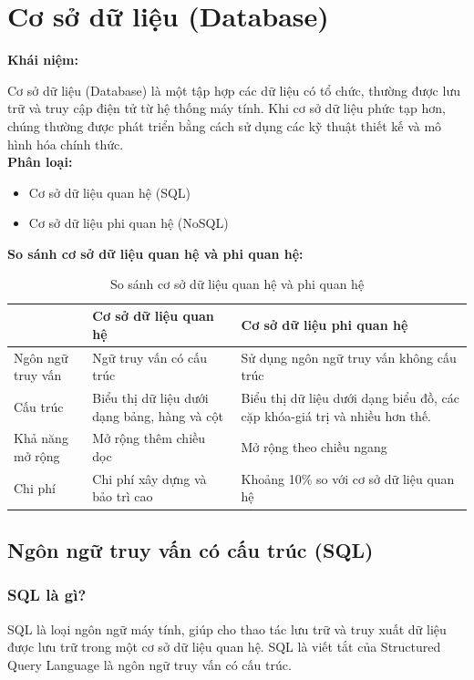 \section{Cơ sở dữ liệu (Database)}
\textbf{Khái niệm:}

Cơ sở dữ liệu (Database) là một tập hợp các dữ liệu có tổ chức, thường được lưu trữ và truy cập điện tử từ hệ thống máy tính. Khi cơ sở dữ liệu phức tạp hơn, chúng thường được phát triển bằng cách sử dụng các kỹ thuật thiết kế và mô hình hóa chính thức.\\

\textbf{Phân loại:}
\begin{itemize}
    \item Cơ sở dữ liệu quan hệ (SQL)
    \item Cơ sở dữ liệu phi quan hệ (NoSQL)
\end{itemize}

\textbf{So sánh cơ sở dữ liệu quan hệ và phi quan hệ:}
\begin{table}[H]
	    \centering
	    \begin{tabular}{|p{3cm}|p{6cm}|p{6cm}|}
	    \hline
	    &Cơ sở dữ liệu quan hệ&Cơ sở dữ liệu phi quan hệ\\
	    \hline
	    Ngôn ngữ truy vấn&Ngữ truy vấn có cấu trúc&Sử dụng ngôn ngữ truy vấn không cấu trúc\\
	    \hline
	    Cấu trúc&Biểu thị dữ liệu dưới dạng bảng, hàng và cột&Biểu thị dữ liệu dưới dạng biểu đồ, các cặp khóa-giá trị và nhiều hơn thế.\\
	    \hline
	    Khả năng mở rộng&Mở rộng thêm chiều dọc&Mở rộng theo chiều ngang\\
	    \hline
	    Chi phí&Chi phí xây dựng và bảo trì cao&Khoảng 10\% so với cơ sở dữ liệu quan hệ\\
	    \hline
	    \end{tabular}
	    \caption{So sánh cơ sở dữ liệu quan hệ và phi quan hệ}
\end{table}
\subsection{Ngôn ngữ truy vấn có cấu trúc (SQL)}
\subsubsection{SQL là gì?}
SQL là loại ngôn ngữ máy tính, giúp cho thao tác lưu trữ và truy xuất dữ liệu được lưu trữ trong một cơ sở dữ liệu quan hệ. SQL là viết tắt của Structured Query Language là ngôn ngữ truy vấn có cấu trúc.

